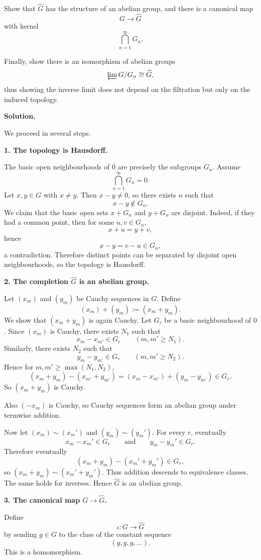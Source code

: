 \documentclass[12pt,a4paper]{article}
\theoremstyle{plain}
\theoremstyle{definition}      %
\begin{document}
Show that \(\widehat G\) has the structure of an abelian group, and there is a canonical map
\[
G\to \widehat G
\]
with kernel
\[
\bigcap_{n=1}^{\infty} G_n.
\]

Finally, show there is an isomorphism of abelian groups
\[
\varprojlim G/G_n \cong \widehat G,
\]
thus showing the inverse limit does not depend on the filtration but only on the induced topology.

\bigskip
\textbf{Solution.}

We proceed in several steps.

\medskip
\textbf{1. The topology is Hausdorff.}

The basic open neighbourhoods of \(0\) are precisely the subgroups \(G_n\). Assume
\[
\bigcap_{n=1}^{\infty} G_n=0.
\]
Let \(x,y\in G\) with \(x\neq y\). Then \(x-y\neq 0\), so there exists \(n\) such that
\[
x-y\notin G_n.
\]
We claim that the basic open sets \(x+G_n\) and \(y+G_n\) are disjoint. Indeed, if they had a common point, then for some \(u,v\in G_n\),
\[
x+u=y+v,
\]
hence
\[
x-y=v-u\in G_n,
\]
a contradiction. Therefore distinct points can be separated by disjoint open neighbourhoods, so the topology is Hausdorff.

\medskip
\textbf{2. The completion \(\widehat G\) is an abelian group.}

Let \((x_m)\) and \((y_m)\) be Cauchy sequences in \(G\). Define
\[
(x_m)+(y_m):=(x_m+y_m).
\]
We show that \((x_m+y_m)\) is again Cauchy. Let \(G_r\) be a basic neighbourhood of \(0\). Since \((x_m)\) is Cauchy, there exists \(N_1\) such that
\[
x_m-x_{m'}\in G_r
\qquad (m,m'\ge N_1).
\]
Similarly, there exists \(N_2\) such that
\[
y_m-y_{m'}\in G_r
\qquad (m,m'\ge N_2).
\]
Hence for \(m,m'\ge \max(N_1,N_2)\),
\[
(x_m+y_m)-(x_{m'}+y_{m'})
=
(x_m-x_{m'})+(y_m-y_{m'})
\in G_r.
\]
So \((x_m+y_m)\) is Cauchy.

Also \((-x_m)\) is Cauchy, so Cauchy sequences form an abelian group under termwise addition.

Now let \((x_m)\sim (x_m')\) and \((y_m)\sim (y_m')\). For every \(r\), eventually
\[
x_m-x_m'\in G_r
\qquad\text{and}\qquad
y_m-y_m'\in G_r.
\]
Therefore eventually
\[
(x_m+y_m)-(x_m'+y_m')\in G_r,
\]
so \((x_m+y_m)\sim (x_m'+y_m')\). Thus addition descends to equivalence classes. The same holds for inverses. Hence \(\widehat G\) is an abelian group.

\medskip
\textbf{3. The canonical map \(G\to \widehat G\).}

Define
\[
\iota:G\to \widehat G
\]
by sending \(g\in G\) to the class of the constant sequence
\[
(g,g,g,\dots).
\]
This is a homomorphism.
\end{document}
